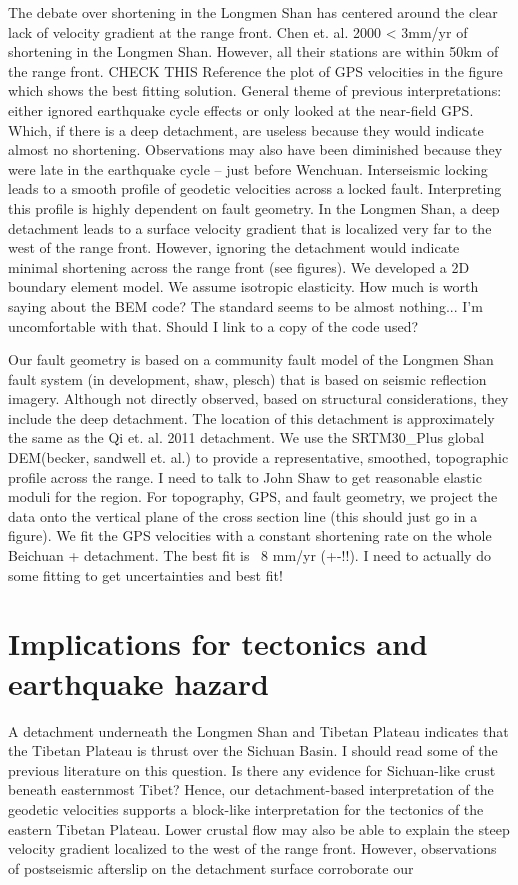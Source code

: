 \documentclass{article}
\begin{document}
The debate over shortening in the Longmen Shan has centered around the clear lack of velocity gradient at the range front.
Chen et. al. 2000 < 3mm/yr of shortening in the Longmen Shan.
However, all their stations are within 50km of the range front. CHECK THIS
Reference the plot of GPS velocities in the figure which shows the best fitting solution.
General theme of previous interpretations: either ignored earthquake cycle effects or only looked at the near-field GPS.
Which, if there is a deep detachment, are useless because they would indicate almost no shortening.
Observations may also have been diminished because they were late in the earthquake cycle – just before Wenchuan.
Interseismic locking leads to a smooth profile of geodetic velocities across a locked fault.
Interpreting this profile is highly dependent on fault geometry.
In the Longmen Shan, a deep detachment leads to a surface velocity gradient that is localized very far to the west of the range front.
However, ignoring the detachment would indicate minimal shortening across the range front (see figures).
We developed a 2D boundary element model.
We assume isotropic elasticity.
How much is worth saying about the BEM code?
The standard seems to be almost nothing...
I'm uncomfortable with that.
Should I link to a copy of the code used?

Our fault geometry is based on a community fault model of the Longmen Shan fault system (in development, shaw, plesch) that is based on seismic reflection imagery.
Although not directly observed, based on structural considerations, they include the deep detachment.
The location of this detachment is approximately the same as the Qi et. al. 2011 detachment. We use the SRTM30\_Plus global DEM(becker, sandwell et. al.)  to provide a representative, smoothed, topographic profile across the range. 
I need to talk to John Shaw to get reasonable elastic moduli for the region.
For topography, GPS, and fault geometry, we project the data onto the vertical plane of the cross section line (this should just go in a figure).
We fit the GPS velocities with a constant shortening rate on the whole Beichuan + detachment. The best fit is ~8 mm/yr (+-!!). 
I need to actually do some fitting to get uncertainties and best fit!

\section{Implications for tectonics and earthquake hazard}
A detachment underneath the Longmen Shan and Tibetan Plateau indicates that the Tibetan Plateau is thrust over the Sichuan Basin. I should read some of the previous literature on this question. Is there any evidence for Sichuan-like crust beneath easternmost Tibet? 
Hence, our detachment-based interpretation of the geodetic velocities supports a block-like interpretation for the tectonics of the eastern Tibetan Plateau. Lower crustal flow may also be able to explain the steep velocity gradient localized to the west of the range front. However, observations of postseismic afterslip on the detachment surface corroborate our  
\end{document}
